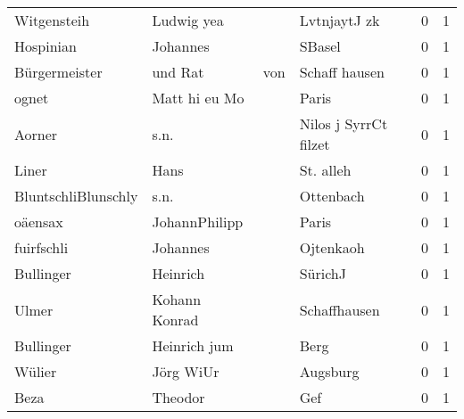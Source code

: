 \documentclass[10pt,a4paper,landscape]{article}
\begin{document}
\begin{longtable}{llllrr}
              Witgensteih &                         Ludwig yea &             &                                LvtnjaytJ zk &          0 &         1 \\
                Hospinian &                           Johannes &             &                                      SBasel &          0 &         1 \\
            Bürgermeister &                            und Rat &         von &                               Schaff hausen &          0 &         1 \\
                    ognet &                      Matt hi eu Mo &             &                                       Paris &          0 &         1 \\
                   Aorner &                               s.n. &             &                       Nilos j SyrrCt filzet &          0 &         1 \\
                    Liner &                               Hans &             &                                   St. alleh &          0 &         1 \\
      BluntschliBlunschly &                               s.n. &             &                                   Ottenbach &          0 &         1 \\
                  oäensax &                      JohannPhilipp &             &                                       Paris &          0 &         1 \\
               fuirfschli &                           Johannes &             &                                   Ojtenkaoh &          0 &         1 \\
                Bullinger &                           Heinrich &             &                                     SürichJ &          0 &         1 \\
                    Ulmer &                      Kohann Konrad &             &                                Schaffhausen &          0 &         1 \\
                Bullinger &                       Heinrich jum &             &                                        Berg &          0 &         1 \\
                   Wülier &                          Jörg WiUr &             &                                    Augsburg &          0 &         1 \\
                     Beza &                            Theodor &             &                                         Gef &          0 &         1 \\

\end{longtable}
\end{document}
